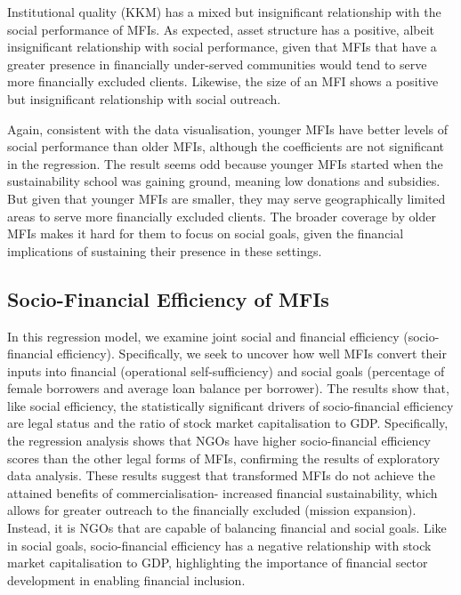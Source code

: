 \documentclass[
]{article}
\begin{document}
Institutional quality (KKM) has a mixed but insignificant relationship
with the social performance of MFIs. As expected, asset structure has a
positive, albeit insignificant relationship with social performance,
given that MFIs that have a greater presence in financially under-served
communities would tend to serve more financially excluded clients.
Likewise, the size of an MFI shows a positive but insignificant
relationship with social outreach.

Again, consistent with the data visualisation, younger MFIs have better
levels of social performance than older MFIs, although the coefficients
are not significant in the regression. The result seems odd because
younger MFIs started when the sustainability school was gaining ground,
meaning low donations and subsidies. But given that younger MFIs are
smaller, they may serve geographically limited areas to serve more
financially excluded clients. The broader coverage by older MFIs makes
it hard for them to focus on social goals, given the financial
implications of sustaining their presence in these settings.

\hypertarget{socio-financial-efficiency-of-mfis}{%
\subsection{Socio-Financial Efficiency of
MFIs}\label{socio-financial-efficiency-of-mfis}}

In this regression model, we examine joint social and financial
efficiency (socio-financial efficiency). Specifically, we seek to
uncover how well MFIs convert their inputs into financial (operational
self-sufficiency) and social goals (percentage of female borrowers and
average loan balance per borrower). The results show that, like social
efficiency, the statistically significant drivers of socio-financial
efficiency are legal status and the ratio of stock market capitalisation
to GDP. Specifically, the regression analysis shows that NGOs have
higher socio-financial efficiency scores than the other legal forms of
MFIs, confirming the results of exploratory data analysis. These results
suggest that transformed MFIs do not achieve the attained benefits of
commercialisation- increased financial sustainability, which allows for
greater outreach to the financially excluded (mission expansion).
Instead, it is NGOs that are capable of balancing financial and social
goals. Like in social goals, socio-financial efficiency has a negative
relationship with stock market capitalisation to GDP, highlighting the
importance of financial sector development in enabling financial
inclusion.
\end{document}
